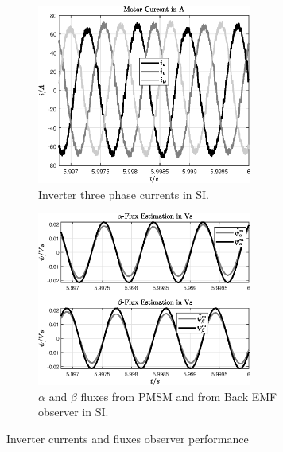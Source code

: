 \documentclass[11pt,a4paper,oneside]{book}
\numberwithin{equation}{section}
\theoremstyle{it}
\theoremstyle{definition}
\begin{document}
\begin{figure}[H]
	\centering
	\begin{subfigure}{0.5\textwidth}
		\centering
		\includegraphics[width = 200pt, angle = 0, 
		keepaspectratio]{figures/preliminary_simulation_results/sim_results_preliminary_fig_3.eps}
		\captionsetup{width=0.65\textwidth, font=footnotesize}	
		\caption{Inverter three phase currents in SI.}
		\label{psim_results_fig_3}
	\end{subfigure}%
	\begin{subfigure}{.5\textwidth}
		\centering
		\includegraphics[width = 200pt, angle = 0, 
		keepaspectratio]{figures/preliminary_simulation_results/sim_results_preliminary_fig_4.eps}
		\captionsetup{width=0.65\textwidth, font=footnotesize}	
		\caption{$\alpha$ and $\beta$ fluxes from PMSM and from Back EMF observer in SI.}
		\label{psim_results_fig_4}
	\end{subfigure}
	\captionsetup{width=0.5\textwidth, font=small}	
	\caption{Inverter currents and fluxes observer performance}
	\label{psim_results_fig_34}
\end{figure}
\end{document}
